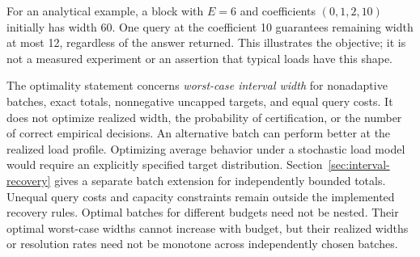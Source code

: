 \documentclass[12pt]{article}
\begin{document}
For an analytical example, a block with $E=6$ and coefficients
$(0,1,2,10)$ initially has width 60. One query at the coefficient 10
guarantees remaining width at most 12, regardless of the answer returned.
This illustrates the objective; it is not a measured
experiment or an assertion that typical loads have this shape.

The optimality statement concerns \emph{worst-case interval width} for
nonadaptive batches, exact totals, nonnegative uncapped targets, and equal
query costs. It does not optimize realized width, the probability of
certification, or the number of correct empirical decisions. An alternative
batch can perform better at the realized load profile. Optimizing average behavior under a stochastic load model would require
an explicitly specified target distribution.
Section~\ref{sec:interval-recovery} gives a separate batch extension for
independently bounded totals. Unequal query costs and capacity constraints
remain outside the implemented recovery rules.
Optimal batches for different budgets need not be nested. Their optimal
worst-case widths cannot increase with budget, but their realized widths
or resolution rates need not be monotone across independently chosen batches.
\end{document}
